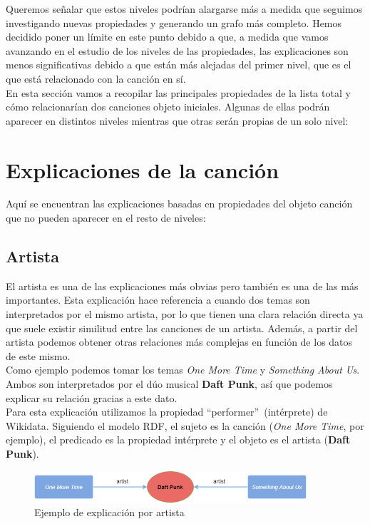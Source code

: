 Queremos señalar que estos niveles podrían alargarse más a medida que seguimos investigando nuevas propiedades y generando un grafo más completo. Hemos decidido poner un límite en este punto debido a que, a medida que vamos avanzando en el estudio de los niveles de las propiedades, las explicaciones son menos significativas debido a que están más alejadas del primer nivel, que es el que está relacionado con la canción en sí.\\

En esta sección vamos a recopilar las principales propiedades de la lista total y cómo relacionarían dos canciones objeto iniciales. Algunas de ellas podrán aparecer en distintos niveles mientras que otras serán propias de un solo nivel:\\

\section{Explicaciones de la canción}

Aquí se encuentran las explicaciones basadas en propiedades del objeto canción que no pueden aparecer en el resto de niveles:

\subsection*{Artista}

El artista es una de las explicaciones más obvias pero también es una de las más importantes. Esta explicación hace referencia a cuando dos temas son interpretados por el mismo artista, por lo que tienen una clara relación directa ya que suele existir similitud entre las canciones de un artista. Además, a partir del artista podemos obtener otras relaciones más complejas en función de los datos de este mismo.\\

Como ejemplo podemos tomar los temas \textit{One More Time} y \textit{Something About Us}. Ambos son interpretados por el dúo musical \textbf{Daft Punk}, así que podemos explicar su relación gracias a este dato.\\

Para esta explicación utilizamos la propiedad ``performer''~(intérprete) de Wikidata. Siguiendo el modelo RDF, el sujeto es la canción (\textit{One More Time}, por ejemplo), el predicado es la propiedad intérprete y el objeto es el artista (\textbf{Daft Punk}).\\

\begin{figure}[h!]
	\centering
	\includegraphics[width = 0.9\textwidth]{Imagenes/Bitmap/Artista ejemplo.png}
	\caption{Ejemplo de explicación por artista}
	\label{fig:sampleImage}
\end{figure}

